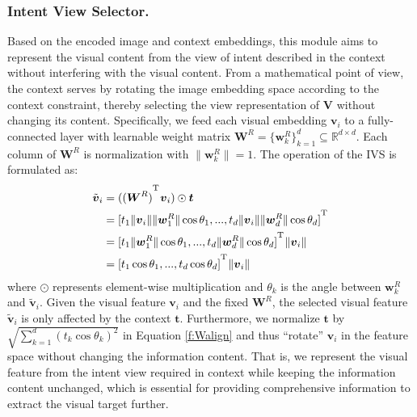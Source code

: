 \documentclass[letterpaper]{article} \usepackage{aaai24}  \usepackage{times}  \usepackage{helvet}  \usepackage{courier}  \usepackage[hyphens]{url}  \usepackage{graphicx} \urlstyle{rm} \def\UrlFont{\rm}  \usepackage{natbib}  \usepackage{caption} \frenchspacing  \setlength{\pdfpagewidth}{8.5in} \setlength{\pdfpageheight}{11in} \usepackage{algorithm}
\begin{document}
\subsubsection{Intent View Selector.} Based on the encoded image and context embeddings, this module aims to represent the visual content from the view of intent described in the context without interfering with the visual content. From a mathematical point of view, the context serves by rotating the image embedding space according to the context constraint, thereby selecting the view representation of $\boldsymbol{V}$ without changing its content. Specifically, we feed each visual embedding $\boldsymbol{v}_i$ to a fully-connected layer with learnable weight matrix ${\boldsymbol{W}}^{R}= \{{\boldsymbol{w}}^{R}_k\}_{k=1}^d\subseteq{\mathbb{R}^{d\times{d}}}$. Each column of ${\boldsymbol{W}}^{R}$ is normalization with $\|{\boldsymbol{w}}^{R}_k\|=1$. The operation of the IVS is formulated as: 
\begin{equation}
\begin{aligned}
\tilde{\boldsymbol{v}}_i &= ({(\boldsymbol{W}^{R})}^{\textsuperscript{T}}\boldsymbol{v}_i)\odot{\boldsymbol{t}} \\
                  &= [t_1\|\boldsymbol{v}_i\|\|\boldsymbol{w}^{R}_1\|\cos{\theta_1}, ..., t_d\|\boldsymbol{v}_i\|\|\boldsymbol{w}^{R}_d\|\cos{\theta_d}]^{\textsuperscript{T}} \\
                  &= [t_1\|\boldsymbol{w}^{R}_1\|\cos{\theta_1}, ..., t_d\|\boldsymbol{w}^{R}_d\|\cos{\theta_d}]^{\textsuperscript{T}}\|\boldsymbol{v}_i\| \\
                  &= [t_1\cos{\theta_1}, ..., t_d\cos{\theta_d}]^{\textsuperscript{T}}\|\boldsymbol{v}_i\| 
\end{aligned}
\label{f:Walign}
\end{equation}
\noindent where $\odot$ represents element-wise multiplication and $\theta_k$ is the angle between $\boldsymbol{w}^{R}_k$ and $\tilde{\boldsymbol{v}}_i$. Given the visual feature $\boldsymbol{v}_i$ and the fixed $\boldsymbol{W}^{R}$, the selected visual feature $\tilde{\boldsymbol{v}}_i$ is only affected by the context $\boldsymbol{t}$. Furthermore, we normalize $\boldsymbol{t}$ by $\sqrt{\sum_{k=1}^{d}\left(t_{k}\cos \theta_{k}\right)^{2}}$ in Equation \ref{f:Walign} and thus ``rotate'' $\boldsymbol{v}_i$ in the feature space without changing the information content. That is, we represent the visual feature from the intent view required in context while keeping the information content unchanged, which is essential for providing comprehensive information to extract the visual target further.  
\end{document}
